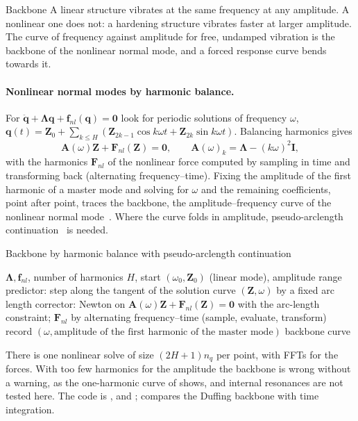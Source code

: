 \begin{sidenote}{Backbone}
A linear structure vibrates at the same frequency at any amplitude. A nonlinear one does not: a hardening structure vibrates faster at larger amplitude. The curve of frequency against amplitude for free, undamped vibration is the backbone of the nonlinear normal mode, and a forced response curve bends towards it.
\end{sidenote}

\paragraph{Nonlinear normal modes by harmonic balance.}
For $\ddot{\bm q}+\bm\Lambda\bm q+\bm f_{nl}(\bm q)=\bm 0$ look for periodic solutions of frequency $\omega$, $\bm q(t)=\bm Z_0+\sum_{k\le H}(\bm Z_{2k-1}\cos k\omega t+\bm Z_{2k}\sin k\omega t)$. Balancing harmonics gives
\begin{equation}\label{eq:ni-hbm}
\bm A(\omega)\bm Z+\bm F_{nl}(\bm Z)=\bm 0,\qquad \bm A(\omega)_k=\bm\Lambda-(k\omega)^2\bm I,
\end{equation}
with the harmonics $\bm F_{nl}$ of the nonlinear force computed by sampling in time and transforming back (alternating frequency--time). Fixing the amplitude of the first harmonic of a master mode and solving for $\omega$ and the remaining coefficients, point after point, traces the backbone, the amplitude--frequency curve of the nonlinear normal mode~\cite{kerschen2009nnm,peeters2009nnm}. Where the curve folds in amplitude, pseudo-arclength continuation~\cite{keller1977} is needed.

\begin{algbox}{Backbone by harmonic balance with pseudo-arclength continuation}
\begin{pseudo}
\Require $\bm\Lambda,\bm f_{nl}$, number of harmonics $H$, start $(\omega_0,\bm Z_0)$ (linear mode), amplitude range
\Repeat
  \State predictor: step along the tangent of the solution curve $(\bm Z,\omega)$ by a fixed arc length
  \State corrector: Newton on $\bm A(\omega)\bm Z+\bm F_{nl}(\bm Z)=\bm0$ with the arc-length constraint; $\bm F_{nl}$ by alternating frequency--time (sample, evaluate, transform)
  \State record $(\omega,\text{amplitude of the first harmonic of the master mode})$
\Ensure backbone curve
\end{pseudo}
\end{algbox}

There is one nonlinear solve of size $(2H+1)n_q$ per point, with FFTs for the forces. With too few harmonics for the amplitude the backbone is wrong without a warning, as the one-harmonic curve of  shows, and internal resonances are not tested here. The code is ,  and ;  compares the Duffing backbone with time integration.

